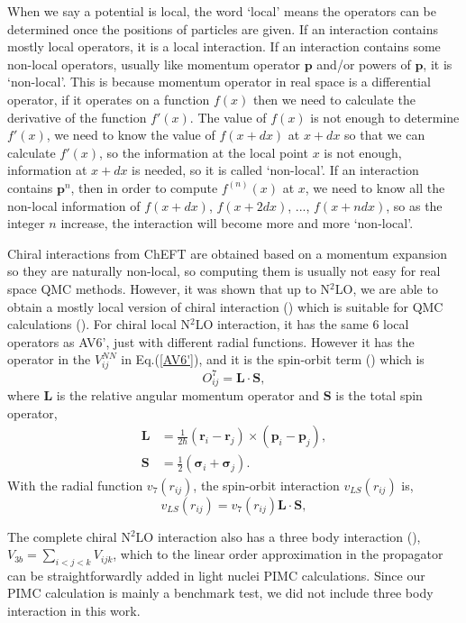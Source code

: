 \documentclass[12pt,letterpaper,UTF8]{report}
\begin{document}
When we say a potential is local, the word `local' means the operators can be determined once the positions of particles are given. If an interaction contains mostly local operators, it is a local interaction. If an interaction contains some non-local operators, usually like momentum operator $\bm{p}$ and/or powers of $\bm{p}$, it is `non-local'. This is because momentum operator in real space is a differential operator, if it operates on a function $f(x)$ then we need to calculate the derivative of the function $f'(x)$. The value of $f(x)$ is not enough to determine $f'(x)$, we need to know the value of $f(x+dx)$ at $x+dx$ so that we can calculate $f'(x)$, so the information at the local point $x$ is not enough, information at $x+dx$ is needed, so it is called `non-local'.
If an interaction contains $\bm{p}^n$, then in order to compute $f^{(n)}(x)$ at $x$, we need to know all the non-local information of $f(x+dx)$, $f(x+2dx)$, ..., $f(x+ndx)$, so as the integer $n$ increase, the interaction will become more and more `non-local'.

Chiral interactions from ChEFT are obtained based on a momentum expansion so they are naturally non-local, so computing them is usually not easy for real space QMC methods.
However, it was shown that up to N$^2$LO, we are able to obtain a mostly local version of chiral interaction (\cite{Gerzerlis13a}) which is suitable for QMC calculations (\cite{Lynn14a,Gerzerlis14a,Lynn2017PRC,Lonardoni2018PRL,Lonardoni2018PRC}).
For chiral local N$^2$LO interaction, it has the same 6 local operators as AV6', just with different radial functions.
However it has the  operator in the $V^{NN}_{ij}$ in Eq.(\ref{AV6'}), and it is the spin-orbit term (\cite{Lonardoni2018PRC}) which is
\begin{equation}
O_{ij}^7 = \bm{L} \cdot \bm{S},
\end{equation}
where $\bm{L}$ is the relative angular momentum operator and $\bm{S}$ is the total spin operator,
\begin{align}
\bm{L} & = \frac{1}{2\hbar}(\bm{r}_i-\bm{r}_j) \times (\bm{p}_i-\bm{p}_j) , \\
\bm{S} & = \frac{1}{2} (\bm{\sigma}_i+\bm{\sigma}_j) .
\end{align}
With the radial function $v_7(r_{ij})$, the spin-orbit interaction $v_{LS}(r_{ij})$ is,
\begin{equation}
v_{LS}(r_{ij})=v_7(r_{ij}) \bm{L} \cdot \bm{S},
\label{vlsrij}
\end{equation}

The complete chiral N$^2$LO interaction also has a three body interaction (\cite{Lonardoni2018PRC}), $V_{3b}=\sum_{i<j<k}V_{ijk}$,
which to the linear order approximation in the propagator can be straightforwardly added in light nuclei PIMC calculations. Since our PIMC calculation is mainly a benchmark test, we did not include three body interaction in this work.
\end{document}
